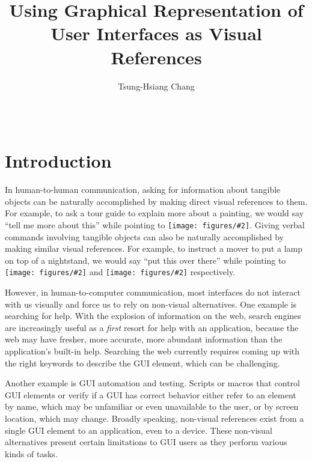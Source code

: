 \documentclass{chi2009}
\newcommand{\img}[2][0.2in]{\texttt{[image: figures/\#2]}}
\begin{document}
\setlength{\paperheight}{11in}
\setlength{\paperwidth}{8.5in}
\setlength{\pdfpageheight}{\paperheight}
\setlength{\pdfpagewidth}{\paperwidth}

\title{Using Graphical Representation of User Interfaces as Visual References}
\author{Tsung-Hsiang Chang\\
\\
\\
}
\date{}
\maketitle

\begin{abstract}
\end{abstract}

\section{Introduction}
In human-to-human communication, asking for information about tangible objects
can be naturally accomplished by making direct visual references to them. For
example, to ask a tour guide to explain more about a painting, we would say
``tell me more about this'' while pointing to \img{paint.png}. 
Giving verbal commands involving
tangible objects can also be naturally accomplished by making similar visual
references. For example, to instruct a mover to put a lamp on top of a
nightstand, we would say “put this over there” while pointing to 
\img{lamp.png}  and \img{cabinet.png} respectively.

However, in human-to-computer communication, most interfaces do not
interact with us visually and force us to rely on non-visual alternatives. One
example is searching for help.  With the explosion of information on the web,
search engines are increasingly useful as a {\it first} resort for help with an
application, because the web may have fresher, more accurate, more abundant
information than the application’s built-in help.  Searching the web currently
requires coming up with the right keywords to describe the GUI element, which
can be challenging.

Another example is GUI automation and testing. 
Scripts or macros that control GUI elements or verify if a GUI
has correct behavior
either refer to an element by name, which may be unfamiliar or even unavailable
to the user, or by screen location, which may change. 
Broadly speaking, non-visual references exist from a 
single GUI element to an application, even to a device.
These non-visual
alternatives present certain limitations to GUI users as they perform 
various kinds of tasks.
\end{document}
